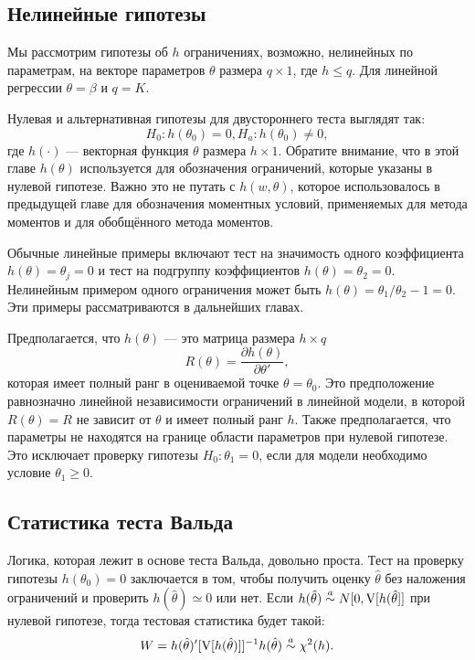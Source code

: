 \subsection{Нелинейные гипотезы}

Мы рассмотрим гипотезы об $h$ ограничениях, возможно, нелинейных по параметрам, на векторе параметров $\theta$ размера $q \times 1$, где $h \leq q$. Для линейной регрессии $\theta = \beta$ и $q = K$.

Нулевая и альтернативная гипотезы для двустороннего теста выглядят так:
\begin{equation}
H_0: h(\theta_0) = 0,
H_a: h(\theta_0) \not= 0,
\end{equation}
где $h(\cdot)$ --- векторная функция $\theta$ размера $h \times 1$. Обратите внимание, что в этой главе $h(\theta)$ используется для обозначения ограничений, которые указаны в нулевой гипотезе. Важно это не путать с $h(w, \theta)$, которое использовалось в предыдущей главе для обозначения моментных условий, применяемых для метода моментов и для обобщённого метода моментов.

Обычные линейные примеры включают тест на значимость одного коэффициента $h(\theta) = \theta_j = 0$ и тест на подгруппу коэффициентов $h(\theta) = \theta_2 = 0$. Нелинейным примером одного ограничения может быть $h(\theta) = \theta_1/\theta_2 - 1 = 0$. Эти примеры рассматриваются в дальнейших главах.

Предполагается, что $h(\theta)$ --- это матрица размера $h \times q$
\begin{equation}
R(\theta) = \frac{\partial{h(\theta)}}{\partial{\theta'}},
\end{equation}
которая имеет полный ранг в оцениваемой точке $\theta = \theta_0$. Это предположение равнозначно линейной независимости ограничений в линейной модели, в которой $R(\theta) = R$ не зависит от $\theta$ и имеет полный ранг $h$. Также предполагается, что параметры не находятся на границе области параметров при нулевой гипотезе. Это исключает проверку гипотезы $H_0: \theta_1 = 0$, если для модели необходимо условие $\theta_1 \geq 0$.

\subsection{Статистика теста Вальда}

Логика, которая лежит в основе теста Вальда, довольно проста. Тест на проверку гипотезы $h(\theta_0) = 0$ заключается в том, чтобы получить оценку $\hat{\theta}$ без наложения ограничений и проверить $h(\hat{\theta}) \simeq  0$ или нет. Если $h(\hat{\theta}) \stackrel{a}{\sim} N[0, \mathrm{V}[h(\hat{\theta}]]$ при нулевой гипотезе, тогда тестовая статистика будет такой:
\[
W = h(\hat{\theta})'[\mathrm{V}[h(\hat{\theta})]]^{-1}h(\hat{\theta}) \stackrel{a}{\sim} \chi^2(h).
\]

